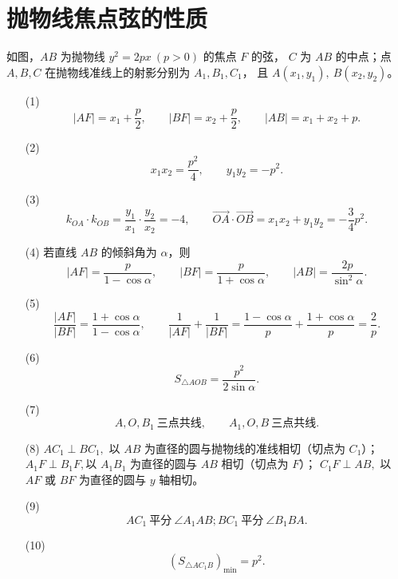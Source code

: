 \documentclass[UTF8]{ctexart}
\begin{document}
	

	\section*{抛物线焦点弦的性质}
	
	
	如图，$AB$ 为抛物线 $y^2=2px\ (p>0)$ 的焦点 $F$ 的弦，
	$C$ 为 $AB$ 的中点；点 $A,B,C$ 在抛物线准线上的射影分别为 $A_1,B_1,C_1$，
	且 $A(x_1,y_1),\ B(x_2,y_2)$。
	
	\medskip
	
	\begin{enumerate}
		\item[(1)] \[
		|AF|=x_1+\frac p2,\qquad |BF|=x_2+\frac p2,\qquad |AB|=x_1+x_2+p.
		\]
		
		\item[(2)] \[
		x_1x_2=\frac{p^2}{4},\qquad y_1y_2=-p^2.
		\]
		
		\item[(3)] \[
		k_{OA}\cdot k_{OB}=\frac{y_1}{x_1}\cdot\frac{y_2}{x_2}=-4,\qquad
		\overrightarrow{OA}\cdot\overrightarrow{OB}=x_1x_2+y_1y_2=-\frac34p^2.
		\]
		
		\item[(4)] 若直线 $AB$ 的倾斜角为 $\alpha$，则
		\[
		|AF|=\frac{p}{1-\cos\alpha},\qquad
		|BF|=\frac{p}{1+\cos\alpha},\qquad
		|AB|=\frac{2p}{\sin^2\alpha}.
		\]
		
		\item[(5)] \[
		\frac{|AF|}{|BF|}=\frac{1+\cos\alpha}{1-\cos\alpha},\qquad
		\frac1{|AF|}+\frac1{|BF|}
		=\frac{1-\cos\alpha}{p}+\frac{1+\cos\alpha}{p}
		=\frac{2}{p}.
		\]
		
		\item[(6)] \[
		S_{\triangle AOB}=\frac{p^2}{2\sin\alpha}.
		\]
		
		\item[(7)] \[
		A,O,B_1\ \text{三点共线},\qquad A_1,O,B\ \text{三点共线}.
		\]
		
		\item[(8)] \( AC_1\perp BC_1,\)
		以 $AB$ 为直径的圆与抛物线的准线相切（切点为 $C_1$）；
		\( 	A_1F\perp B_1F,\)以 $A_1B_1$ 为直径的圆与 $AB$ 相切（切点为 $F$）；
		\( C_1F\perp AB, \)
		以 $AF$ 或 $BF$ 为直径的圆与 $y$ 轴相切。
		
		\item[(9)] \[
		AC_1\ \text{平分}\ \angle A_1AB; BC_1\ \text{平分}\ \angle B_1BA.
		\]
		
		\item[(10)] \[
		\left(S_{\triangle AC_1B}\right)_{\min}=p^2.
		\]
	\end{enumerate}
	
\end{document}
